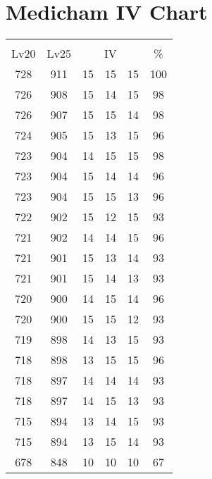 \documentclass{article}%
\begin{document}
%
\normalsize%
\section{Medicham IV Chart}%
\label{sec:Medicham IV Chart}%
\renewcommand{\arraystretch}{1.5}%
\begin{tabular}{|c|c|c|c|c|c|}%
\hline%
\multicolumn{6}{|c|}{\textcolor{white}{ 
\linebreak{Medicham}
}%
\cellcolor{black}}\\%
\multicolumn{1}{|c}{Lv20}&\multicolumn{1}{c|}{Lv25}&\multicolumn{3}{c|}{IV}&\multicolumn{1}{|c|}{\%}\\%
\hline%
\rowcolor{color100}%
728&911&15&15&15&100\\%
\hline%
\rowcolor{color98}%
726&908&15&14&15&98\\%
\hline%
\rowcolor{color98}%
726&907&15&15&14&98\\%
\hline%
\rowcolor{color96}%
724&905&15&13&15&96\\%
\hline%
\rowcolor{color98}%
723&904&14&15&15&98\\%
\hline%
\rowcolor{color96}%
723&904&15&14&14&96\\%
\hline%
\rowcolor{color96}%
723&904&15&15&13&96\\%
\hline%
\rowcolor{color93}%
722&902&15&12&15&93\\%
\hline%
\rowcolor{color96}%
721&902&14&14&15&96\\%
\hline%
\rowcolor{color93}%
721&901&15&13&14&93\\%
\hline%
\rowcolor{color93}%
721&901&15&14&13&93\\%
\hline%
\rowcolor{color96}%
720&900&14&15&14&96\\%
\hline%
\rowcolor{color93}%
720&900&15&15&12&93\\%
\hline%
\rowcolor{color93}%
719&898&14&13&15&93\\%
\hline%
\rowcolor{color96}%
718&898&13&15&15&96\\%
\hline%
\rowcolor{color93}%
718&897&14&14&14&93\\%
\hline%
\rowcolor{color93}%
718&897&14&15&13&93\\%
\hline%
\rowcolor{color93}%
715&894&13&14&15&93\\%
\hline%
\rowcolor{color93}%
715&894&13&15&14&93\\%
\hline%
\rowcolor{color91}%
678&848&10&10&10&67\\%
\end{tabular}

%
\end{document}
